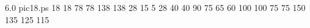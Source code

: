  6.0 pic18.ps 
{}{}{
 18 
 18 
 78 
 78 
 138 
 138 
 28  
 15 
 5 
 28 
 40 
 40 
 90 
 75 
 65 
 60 
 100 
 100 
 75 
 75 
 150 
 135 
 125 
 115 
}
